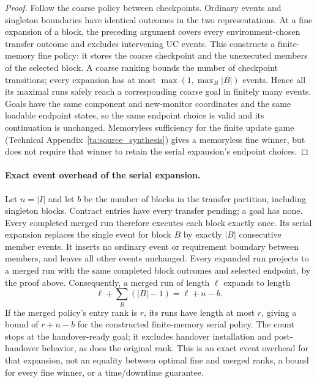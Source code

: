 \begin{proof}
Follow the coarse policy between checkpoints. Ordinary events and singleton boundaries have identical outcomes in the two representations. At a fine expansion of a block, the preceding argument covers every environment-chosen transfer outcome and excludes intervening UC events. This constructs a finite-memory fine policy: it stores the coarse checkpoint and the unexecuted members of the selected block. A coarse ranking bounds the number of checkpoint transitions; every expansion has at most $\max(1,\max_B|B|)$ events. Hence all its maximal runs safely reach a corresponding coarse goal in finitely many events. Goals have the same component and new-monitor coordinates and the same loadable endpoint states, so the same endpoint choice is valid and its continuation is unchanged. Memoryless sufficiency for the finite update game (Technical Appendix~\ref{ta:source_synthesis}) gives a memoryless fine winner, but does not require that winner to retain the serial expansion's endpoint choices.
\end{proof}

\paragraph{Exact event overhead of the serial expansion.}
Let $n=|I|$ and let $b$ be the number of blocks in the transfer partition, including singleton blocks. Contract entries have every transfer pending; a goal has none. Every completed merged run therefore executes each block exactly once. Its serial expansion replaces the single event for block $B$ by exactly $|B|$ consecutive member events. It inserts no ordinary event or requirement boundary between members, and leaves all other events unchanged. Every expanded run projects to a merged run with the same completed block outcomes and selected endpoint, by the proof above. Consequently, a merged run of length $\ell$ expands to length
\[
 \ell+\sum_{B}(|B|-1)=\ell+n-b.
\]
If the merged policy's entry rank is $r$, its runs have length at most $r$, giving a bound of $r+n-b$ for the constructed finite-memory serial policy. The count stops at the handover-ready goal; it excludes handover installation and post-handover behavior, as does the original rank. This is an exact event overhead for that expansion, not an equality between optimal fine and merged ranks, a bound for every fine winner, or a time/downtime guarantee.

